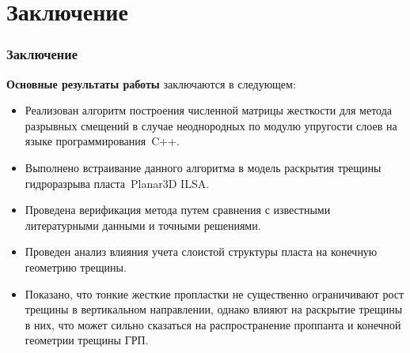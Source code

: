 \section{Заключение}
\begin{frame}
    \frametitle{Заключение}
    \textbf{Основные результаты работы} заключаются в следующем:
    \begin{itemize}
        \item Реализован алгоритм построения численной матрицы жесткости для метода разрывных смещений в случае неоднородных по модулю упругости слоев на языке программирования~C++.
        \item Выполнено встраивание данного алгоритма в модель раскрытия трещины гидроразрыва пласта Planar3D ILSA.
        \item Проведена верификация метода путем сравнения с известными литературными данными и точными решениями.
        \item Проведен анализ влияния учета слоистой структуры пласта на конечную геометрию трещины.
        \item Показано, что тонкие жесткие пропластки не существенно ограничивают рост трещины в вертикальном направлении, однако влияют на раскрытие трещины в них, что может сильно сказаться на распространение проппанта и конечной геометрии трещины ГРП. 
    \end{itemize}
\end{frame}

